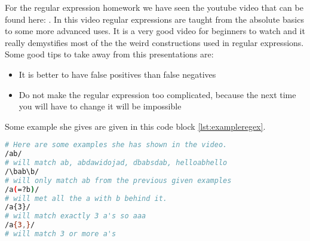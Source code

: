 For the regular expression homework we have seen the youtube video that can be found here: \cite{leaverou1}. In this video regular expressions are taught from the absolute basics to some more advanced uses. It is a very good video for beginners to watch and it really demystifies most of the the weird constructions used in regular expressions. Some good tips to take away from this presentations are:
\begin{itemize}
\item It is better to have false positives than false negatives
\item Do not make the regular expression too complicated, because the next time you will have to change it will be impossible
\end{itemize}
Some example she gives are given in this code block \ref{lst:exampleregex}.

\begin{lstlisting}[language=bash,label=lst:exampleregex,caption=Regex examples]
# Here are some examples she has shown in the video.
/ab/
# will match ab, abdawidojad, dbabsdab, helloabhello
/\bab\b/ 
# will only match ab from the previous given examples
/a(=?b)/
# will met all the a with b behind it.
/a{3}/
# will match exactly 3 a's so aaa
/a{3,}/
# will match 3 or more a's
\end{lstlisting}